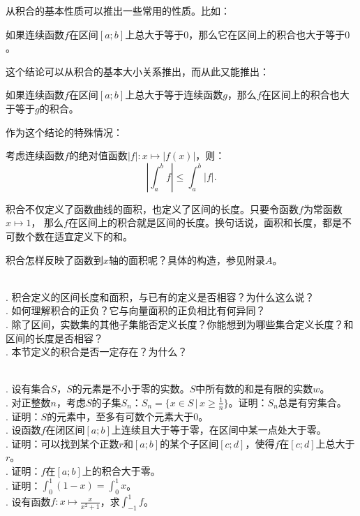 \documentclass[12pt,UTF8]{ctexbook}
\begin{document}
从积合的基本性质可以推出一些常用的性质。比如：

\begin{tm}
    如果连续函数$f$在区间$[a; b]$上总大于等于$0$，那么它在区间上的积合也大于等于$0$。
\end{tm}

这个结论可以从积合的基本大小关系推出，而从此又能推出：

\begin{tm}
    如果连续函数$f$在区间$[a; b]$上总大于等于连续函数$g$，那么$f$在区间上的积合也大于等于$g$的积合。
\end{tm}

作为这个结论的特殊情况：

\begin{tm}
    考虑连续函数$f$的绝对值函数$|f|: x\mapsto |f(x)|$，则：
    $$ \left| \int_a^b f \right| \leqslant \int_a^b |f|. $$

\end{tm}

积合不仅定义了函数曲线的面积，也定义了区间的长度。只要令函数$f$为常函数$x\mapsto 1$，
那么$f$在区间上的积合就是区间的长度。换句话说，面积和长度，都是不可数个数在适宜定义下的和。

积合怎样反映了函数到$x$轴的面积呢？具体的构造，参见附录$A$。

\begin{sk}
    \mbox{} \\
    . 积合定义的区间长度和面积，与已有的定义是否相容？为什么这么说？\\
    . 如何理解积合的正负？它与向量面积的正负相比有何异同？\\
    . 除了区间，实数集的其他子集能否定义长度？你能想到为哪些集合定义长度？和区间的长度是否相容？\\
    . 本节定义的积合是否一定存在？为什么？
\end{sk}

\begin{xt}
    \mbox{} \\
    . 设有集合$S$，$S$的元素是不小于零的实数。$S$中所有数的和是有限的实数$w$。\\
    . 对正整数$n$，考虑$S$的子集$S_n$：$S_n = \{x\in S \, | \, x \geqslant \frac{1}{n}\}$。证明：$S_n$总是有穷集合。\\
    . 证明：$S$的元素中，至多有可数个元素大于$0$。\\
    . 设函数$f$在闭区间$[a; b]$上连续且大于等于零，在区间中某一点处大于零。\\
    . 证明：可以找到某个正数$r$和$[a; b]$的某个子区间$[c;d]$，使得$f$在$[c;d]$上总大于$r$。\\
    . 证明：$f$在$[a; b]$上的积合大于零。\\
    . 证明：$\int_0^1 (1 - x) = \int_0^1 x$。\\
    . 设有函数$f: x\mapsto \frac{x}{x^2+1}$，求$\int_{-1}^1 f$。\\
\end{xt}
\end{document}
